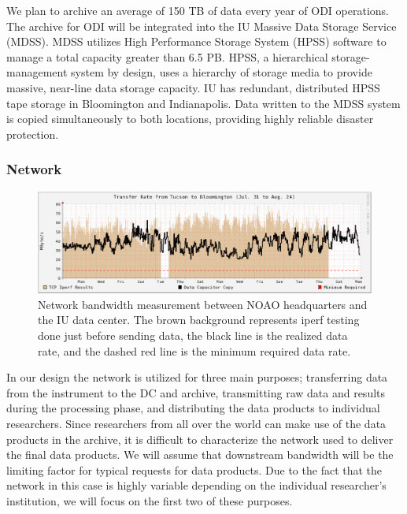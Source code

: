\documentclass[10pt,conference]{IEEEtran}
\begin{document}
We plan to archive an average of 150 TB of data every year of ODI operations. The archive for ODI will be integrated into the IU Massive Data Storage Service (MDSS). MDSS utilizes High Performance Storage System (HPSS) software to manage a total capacity greater than 6.5 PB. HPSS, a hierarchical storage-management system by design, uses a hierarchy of storage media to provide massive, near-line data storage capacity. IU has redundant, distributed HPSS tape storage in Bloomington and Indianapolis. Data written to the MDSS system is copied simultaneously to both locations, providing highly reliable disaster protection. 

\subsubsection{Network}\label{sec:network}
\begin{figure}[t]
\centering
\includegraphics[width=6in]{network_throughput.eps}
\caption{Network bandwidth measurement between NOAO headquarters and the IU data center. The brown background represents iperf testing done just before sending data, the black line is the realized data rate, and the dashed red line is the minimum required data rate.}
\label{fig:network}
\end{figure}

In our design the network is utilized for three main purposes; transferring data from the instrument to the DC and archive, transmitting raw data and results during the processing phase, and distributing the data products to individual researchers. Since researchers from all over the world can make use of the data products in the archive, it is difficult to characterize the network used to deliver the final data products. We will assume that downstream bandwidth will be the limiting factor for typical requests for data products. Due to the fact that the network in this case is highly variable depending on the individual researcher's institution, we will focus on the first two of these purposes. 
\end{document}
